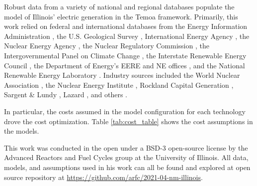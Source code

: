 Robust data from a variety of national and regional databases populate the 
model of Illinois' electric generation in the Temoa framework.
Primarily, this work relied on federal and international databases from the 
Energy Information Administration 
\cite{us_energy_information_administration_eia_preliminary_2021,energy_information_administration_state_2020,us_energy_information_administration_eia_electric_2021,us_energy_information_administration_eia_illinois_2020}, 
the U.S. Geological Survey \cite{hoen_united_2018}, 
International Energy Agency \cite{lorenczik_projected_2020}, 
the Nuclear Energy Agency \cite{crozat_full_2018}, 
the Nuclear Regulatory Commission 
\cite{united_states_nuclear_regulatory_commission_illinois_2020}, 
the Intergovernmental Panel on Climate Change 
\cite{intergovernmental_panel_on_climate_change_annex_2014,intergovernmental_panel_on_climate_change_climate_2014,intergovernmental_panel_on_climate_change_climate_2014-1,intergovernmental_panel_on_climate_change_climate_2014-2},
the Interstate Renewable Energy Council 
\cite{sherwood_us_2009,sherwood_us_2010,sherwood_us_2011,brown_solid_1996,sherwood_us_2012,sherwood_us_2013,sherwood_us_2014}, 
the Department of Energy's EERE and NE offices 
\cite{us_department_of_energy_capital_2016}, and the National Renewable Energy 
Laboratory 
\cite{nrel_national_renewable_energy_laboratory_2020_2020,sengupta_national_2018}.
Industry sources included the World Nuclear Association
\cite{world_nuclear_association_nuclear_2017}
, 
the Nuclear Energy Institute 
\cite{desai_nuclear_2018,desai_nuclear_2020,murphy_impacts_2019,tessum_air_2019},
Rockland Capital Generation \cite{rockland_capital_natural_2021},
Sargent \& Lundy \cite{sargent__lundy_capital_2020}, 
Lazard \cite{ray_lazards_2020},
and others 
\cite{the_solar_foundation_national_2020,solar_energy_industries_association_illinois_2020,rutovitz_calculating_2015}.

In particular, the costs assumed in the model configuration for each technology 
drove the cost optimization. Table \ref{tab:cost_table} shows the cost 
assumptions in the models.




This work was conducted in the open under a BSD-3 open-source license by the 
Advanced Reactors and Fuel Cycles group at the University of Illinois. All 
data, models, and assumptions used in his work can all be found and explored at 
open source repository at 
\url{https://github.com/arfc/2021-04-nm-illinois}.

